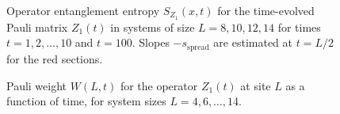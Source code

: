\documentclass[aps,prx,twocolumn,superscriptaddress,floatfix,nofootinbib,prx]{revtex4}
\renewcommand{\>}{\right\rangle}
\newcommand{\<}{\left\langle}
\newcommand{\sspr}{s_\text{spread}}
\begin{document}
\begin{figure}[t]
\caption{
Operator entanglement entropy $S_{Z_1}(x,t)$ for the time-evolved Pauli matrix $Z_1(t)$ in systems of size ${L=8,10,12,14}$ for times $t=1,2,\ldots, 10$ and $t=100$. Slopes $-\sspr$ are estimated at $t=L/2$ for the red sections.}
 \label{SZ1panel}
\end{figure}

\begin{figure}[t]
\caption{
Pauli weight $W(L,t)$ for the operator $Z_1(t)$ at site $L$ as a function of time, for system sizes $L=4,6, \ldots, 14$.
}
 \label{fig:pauliweight}
\end{figure}
\end{document}
